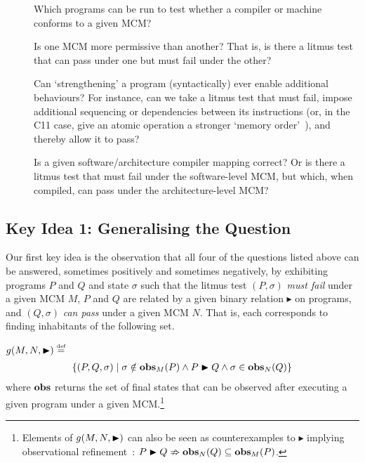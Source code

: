 \begin{description}
%
\item[] Which programs can be run to test whether a
compiler or machine conforms to a given MCM?~\cite{darbari+16,
alglave+10}
%
\item[] Is one MCM more permissive than another? That is, is there
a litmus test that can pass under one but must fail under the
other?~\cite{owens+09, mador-haim+12, mador-haim+10, batty+16,
nienhuis+16, lahav+16, alglave+10}
%
\item[] Can `strengthening' a program (syntactically) ever enable
additional behaviours?  For instance, can we take a litmus test that
must fail, impose additional sequencing or dependencies between its
instructions (or, in the C11 case, give an atomic operation a stronger
`memory order'~\cite[§7.17.3]{c11}), and thereby allow it to
pass?~\cite{sevcik+08, sevcik11, morisset+13, vafeiadis+15,
chakraborty+16, burckhardt+10}
%
\item[] Is a given software/architecture compiler mapping correct?
Or is there a litmus test that must fail under the software-level MCM,
but which, when compiled, can pass under the architecture-level
MCM?~\cite{batty+11, batty+12, wickerson+15a, sevcik+11, lustig+14, lustig+15}
%
\end{description}
%

\subsection{Key Idea 1: Generalising the Question}
\label{sec:intro:contribs}

Our first key idea is the observation that all four of the questions
listed above can be answered, sometimes positively and sometimes negatively, by exhibiting programs $P$ and $Q$ and state
$\sigma$ such that the litmus test $(P,\sigma)$ \emph{must fail} under
a given MCM $M$, $P$ and $Q$ are related by a given binary relation
$\blacktriangleright$ on programs, and $(Q,\sigma)$ \emph{can pass}
under a given MCM $N$. That is, each corresponds to finding inhabitants of
the following set.

\begin{definition} 
\label{def:general_problem_programs}
%
$\GeneralProg(M,N,\blacktriangleright) \eqdef {}$
\[
\{(P,Q,\sigma) \mid \stack{\sigma \notin \obs_{M}(P) \wedge 
P\blacktriangleright Q \wedge \sigma \in \obs_{N}(Q)\}}
\] 
where $\mathbf{obs}$ returns the set of final states that can be observed
after executing a given program under a given MCM.\footnote{Elements of $g(M,N,\blacktriangleright)$
can also be seen as counterexamples to 
$\blacktriangleright$ implying observational
refinement~\cite{hoare72}:
$P\blacktriangleright Q \nRightarrow \mathbf{obs}_{N}(Q)\subseteq
\mathbf{obs}_{M}(P)$.}
\end{definition}


